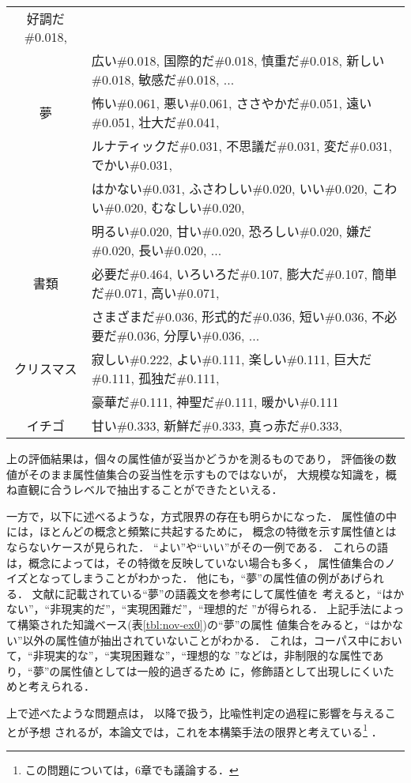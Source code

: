 \begin{table}[tb]
\begin{center}
\begin{tabular}{|c|l|}
好調だ\#0.018,
\\&
広い\#0.018,
国際的だ\#0.018,
慎重だ\#0.018,
新しい\#0.018,
敏感だ\#0.018,
...\\
\hline
夢&
怖い\#0.061,
悪い\#0.061,
ささやかだ\#0.051,
遠い\#0.051,
壮大だ\#0.041,
\\&
ルナティックだ\#0.031,
不思議だ\#0.031,
変だ\#0.031,
でかい\#0.031,
\\&
はかない\#0.031,
ふさわしい\#0.020,
いい\#0.020,
こわい\#0.020,
むなしい\#0.020,
\\&
明るい\#0.020,
甘い\#0.020,
恐ろしい\#0.020,
嫌だ\#0.020,
長い\#0.020,
...\\
\hline
書類&
必要だ\#0.464,
いろいろだ\#0.107,
膨大だ\#0.107,
簡単だ\#0.071,
高い\#0.071,
\\&
さまざまだ\#0.036,
形式的だ\#0.036,
短い\#0.036,
不必要だ\#0.036,
分厚い\#0.036,
...\\
\hline
クリスマス&
寂しい\#0.222,
よい\#0.111,
楽しい\#0.111,
巨大だ\#0.111,
孤独だ\#0.111,
\\&
豪華だ\#0.111,
神聖だ\#0.111,
暖かい\#0.111
\\
\hline
イチゴ&
甘い\#0.333,
新鮮だ\#0.333,
真っ赤だ\#0.333,
\\
\hline
\end{tabular}
\end{center}
\end{table}

上の評価結果は，個々の属性値が妥当かどうかを測るものであり，
評価後の数値がそのまま属性値集合の妥当性を示すものではないが，
大規模な知識を，概ね直観に合うレベルで抽出することができたといえる．

一方で，以下に述べるような，方式限界の存在も明らかになった．
属性値の中には，ほとんどの概念と頻繁に共起するために，
概念の特徴を示す属性値とはならないケースが見られた．
``よい''や``いい''がその一例である．
これらの語は，概念によっては，その特徴を反映していない場合も多く，
属性値集合のノイズとなってしまうことがわかった．
他にも，``夢''の属性値の例があげられる．
文献\cite{GJDict1996}に記載されている``夢''の語義文を参考にして属性値を
考えると，``はかない''，``非現実的だ''，``実現困難だ''，``理想的だ
''が得られる．
上記手法によって構築された知識ベース(表\ref{tbl:nov-ex0})の``夢''の属性
値集合をみると，``はかない''以外の属性値が抽出されていないことがわかる．
これは，コーパス中において，``非現実的な''，``実現困難な''，``理想的な
''などは，非制限的な属性であり，``夢''の属性値としては一般的過ぎるため
に，修飾語として出現しにくいためと考えられる．

上で述べたような問題点は，
以降で扱う，比喩性判定の過程に影響を与えることが予想
されるが，本論文では，これを本構築手法の限界と考えている\footnote{
この問題については，6章でも議論する．}
．

